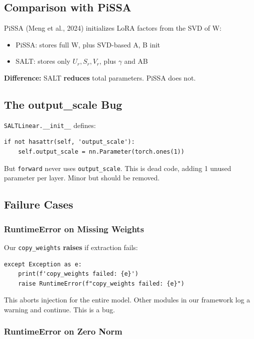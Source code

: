 \subsection{Comparison with PiSSA}

PiSSA (Meng et al., 2024) initializes LoRA factors from the SVD of W:

\begin{itemize}
\item PiSSA: stores full W, plus SVD-based A, B init
\item SALT: stores only $U_r, S_r, V_r$, plus $\gamma$ and AB

\end{itemize}
\textbf{Difference:} SALT \textbf{reduces} total parameters. PiSSA does not.

\subsection{The output\_scale Bug}

\texttt{SALTLinear.\_\_init\_\_} defines:

\begin{lstlisting}
if not hasattr(self, 'output_scale'):
    self.output_scale = nn.Parameter(torch.ones(1))
\end{lstlisting}

But \texttt{forward} never uses \texttt{output\_scale}. This is dead code, adding 1 unused 
parameter per layer. Minor but should be removed.

\subsection{Failure Cases}

\subsubsection{RuntimeError on Missing Weights}

Our \texttt{copy\_weights} \textbf{raises} if extraction fails:

\begin{lstlisting}
except Exception as e:
    print(f'copy_weights failed: {e}')
    raise RuntimeError(f"copy_weights failed: {e}")
\end{lstlisting}

This aborts injection for the entire model. Other modules in our framework 
log a warning and continue. This is a bug.

\subsubsection{RuntimeError on Zero Norm}

